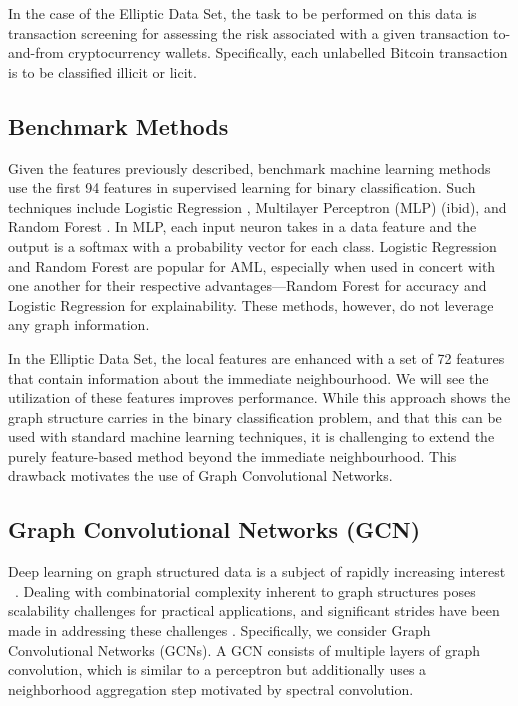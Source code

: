 \documentclass[sigconf,submission]{acmart}
\begin{document}
In the case of the Elliptic Data Set, the task to be performed on this data is transaction screening for assessing the risk associated with a given transaction to-and-from cryptocurrency wallets. Specifically, each unlabelled Bitcoin transaction is to be classified illicit or licit.

\subsection{Benchmark Methods}
Given the features previously described, benchmark machine learning methods use the first 94 features in supervised learning for binary classification. Such techniques include Logistic Regression \citep{Bishop}, Multilayer Perceptron (MLP) (ibid), and Random Forest \cite{breiman2001random}. In MLP, each input neuron takes in a data feature and the output is a softmax with a probability vector for each class. Logistic Regression and Random Forest are popular for AML, especially when used in concert with one another for their respective advantages---Random Forest for accuracy and Logistic Regression for explainability. These methods, however, do not leverage any graph information.

In the Elliptic Data Set, the local features are enhanced with a set of 72 features that contain information about the immediate neighbourhood. We will see the utilization of these features improves performance. While this approach shows the graph structure carries in the binary classification problem, and that this can be used with standard machine learning techniques, it is challenging to extend the purely feature-based method beyond the immediate neighbourhood. This drawback motivates the use of Graph Convolutional Networks.
    
\subsection{Graph Convolutional Networks (GCN)}\label{sec:gconv}
Deep learning on graph structured data is a subject of rapidly increasing interest ~\citep{Bruna2014,Defferrard2016,Li2016,Hamilton2017,Gilmer2017}. Dealing with combinatorial complexity inherent to graph structures poses scalability challenges for practical applications, and significant strides have been made in addressing these challenges \citep{Kipf2017,Chen2018,Ying2018}. Specifically, we consider Graph Convolutional Networks (GCNs). A GCN consists of multiple layers of graph convolution, which is similar to a perceptron but additionally uses a neighborhood aggregation step motivated by spectral convolution.
\end{document}
